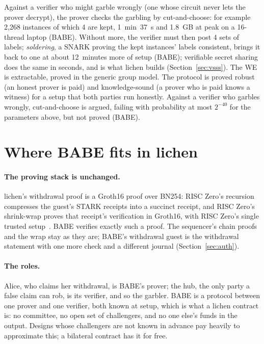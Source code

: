 \documentclass[11pt]{article}
\begin{document}
Against a verifier who might garble wrongly (one whose circuit never lets
the prover decrypt), the prover checks the garbling by cut-and-choose:
for example 2,268 instances of which 4 are kept, 1~min~37~s and 1.8~GB at
peak on a 16-thread laptop (BABE). Without more, the verifier must then
post 4 sets of labels; \emph{soldering}, a SNARK proving the kept
instances' labels consistent, brings it back to one at about 12~minutes
more of setup (BABE); verifiable secret sharing does the same in seconds,
and is what lichen builds (Section~\ref{sec:vsss}). The WE is
extractable, proved in the generic group model. The protocol is proved
robust (an honest prover is paid) and knowledge-sound (a prover who is
paid knows a witness) for a setup that both parties run honestly.
Against a verifier who garbles wrongly, cut-and-choose is argued,
failing with probability at most $2^{-40}$ for the parameters above, but
not proved (BABE).

\section{Where BABE fits in lichen}
\label{sec:fit}

\paragraph{The proving stack is unchanged.} lichen's withdrawal proof is
a Groth16 proof over BN254: RISC Zero's recursion compresses the guest's
STARK receipts into a succinct receipt, and RISC Zero's shrink-wrap
proves that receipt's verification in Groth16, with RISC Zero's single
trusted setup~\cite{risc0}. BABE verifies exactly such a proof. The
sequencer's chain proofs and the wrap stay as they are; BABE's
withdrawal guest is the withdrawal statement with one more check and a
different journal (Section~\ref{sec:auth}).

\paragraph{The roles.} Alice, who claims her withdrawal, is BABE's
prover; the hub, the only party a false claim can rob, is its verifier,
and so the garbler. BABE is a protocol between one prover and one
verifier, both known at setup, which is what a lichen contract is: no
committee, no open set of challengers, and no one else's funds in the
output. Designs whose challengers are not known in advance pay heavily
to approximate this; a bilateral contract has it for free.
\end{document}
